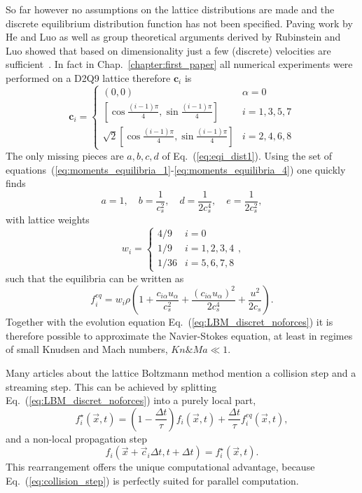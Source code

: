 So far however no assumptions on the lattice distributions are made and the discrete equilibrium distribution function has not been specified.
Paving work by He and Luo as well as group theoretical arguments derived by Rubinstein and Luo showed that based on dimensionality just a few (discrete) velocities are sufficient~\cite{heTheoryLatticeBoltzmann1997, rubinsteinTheoryLatticeBoltzmann2008}.
In fact in Chap.~\ref{chapter:first_paper} all numerical experiments were performed on a D2Q9 lattice therefore $\mathbf{c}_{i}$ is
\begin{equation}\label{eq:speeds_method}
\mathbf{c}_{i}  =
\left\{
\begin{array}{ll}
(0,0) & \alpha = 0 \\
\left[\cos{\frac{(i-1)\pi}{4}}, \sin{\frac{(i-1)\pi}{4}} \right] &  i=1,3,5,7 \\
\sqrt{2}\left[\cos{\frac{(i-1)\pi}{4}}, \sin{\frac{(i-1)\pi}{4}} \right] & i=2,4,6,8
\end{array}
\right.    
\end{equation}
The only missing pieces are $a, b, c, d$ of Eq.~(\ref{eq:eqi_dist1}).
Using the set of equations~(\ref{eq:moments_equilibria_1}-\ref{eq:moments_equilibria_4}) one quickly finds
\begin{equation}
    a = 1,\quad b = \frac{1}{c_s^2},\quad d = \frac{1}{2c_s^4},\quad e = \frac{1}{2c_s^2},
\end{equation}
with lattice weights
\begin{equation}\label{eq:weightsD2Q9_meth}
w_{i} = \begin{cases}
4/9 &\text{$i = 0$}\\
1/9 &\text{$i = 1,2,3,4$}\\
1/36 &\text{$i = 5,6,7,8$}
\end{cases}
,
\end{equation}
such that the equilibria can be written as
\begin{equation}\label{eq:eqi_dist2}
    f_{i}^{eq} = w_{i}\rho\left(1 + \frac{c_{i\alpha} u_{\alpha}}{c_s^2} +  \frac{(c_{i\alpha} u_{\alpha})^2}{2c_s^4} + \frac{u^2}{2c_s}\right).
\end{equation}
Together with the evolution equation Eq.~(\ref{eq:LBM_discret_noforces}) it is therefore possible to approximate the Navier-Stokes equation, at least in regimes of small Knudsen and Mach numbers, $Kn \& Ma \ll 1$.

Many articles about the lattice Boltzmann method mention a collision step and a streaming step.
This can be achieved by splitting Eq.~(\ref{eq:LBM_discret_noforces}) into a purely local part, 
\begin{equation}\label{eq:collision_step}
    f^{\star}_i(\vec{x},t) = \left(1-\frac{\Delta t}{\tau}\right)f_i(\vec{x},t) + \frac{\Delta t}{\tau}f_i^{eq}(\vec{x},t),
\end{equation}
and a non-local propagation step
\begin{equation}\label{eq:steaming_step}
    f_i(\vec{x}+\vec{c}_i\Delta t,t + \Delta t) = f^{\star}_i(\vec{x},t).
\end{equation}
This rearrangement offers the unique computational advantage, because Eq.~(\ref{eq:collision_step}) is perfectly suited for parallel computation.

